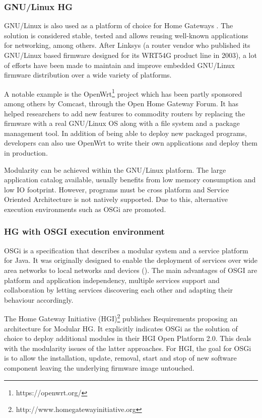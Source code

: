 \subsubsection{GNU/Linux HG}
   
GNU/Linux is also used as a platform of choice for Home Gateways \cite{royon_multiservice_2007}.
The solution is considered stable, tested and allows reusing well-known applications for networking, among others.
After Linksys (a router vendor who published its GNU/Linux based firmware designed for its WRT54G product line in 2003), a lot of efforts have been made to maintain and improve embedded GNU/Linux firmware distribution over a wide variety of platforms.

A notable example is the OpenWrt\footnote{https://openwrt.org/} project which has been partly sponsored among others by Comcast, through the Open Home Gateway Forum.
It has helped researchers to add new features to commodity routers by replacing the firmware with a real GNU/Linux OS along with a file system and a package management tool.
In addition of being able to deploy new packaged programs, developers can also use OpenWrt to write their own applications and deploy them in production.


Modularity can be achieved within the GNU/Linux platform.
The large application catalog available, usually benefits from low memory consumption and low IO footprint.
However, programs must be cross platform and Service Oriented Architecture is not natively supported.
Due to this, alternative execution environments such as OSGi are promoted.
   
\subsubsection{HG with OSGI execution environment}
   
OSGi is a specification that describes a modular system and a service platform for Java.
It was originally designed to enable the deployment of services over wide area networks to local networks and devices (\cite{marples_open_2001}).
The main advantages of OSGI are platform and application independency, multiple services support and collaboration by letting services discovering each other and adapting their behaviour accordingly.

The Home Gateway Initiative (HGI)\footnote{http://www.homegatewayinitiative.org} publishes Requirements \cite{_requirements_2011} \cite{_hg_2014} proposing an architecture for Modular HG.
It explicitly indicates OSGi as the solution of choice to deploy additional modules in their HGI Open Platform 2.0.
This deals with the modularity issues of the latter approaches.
For HGI, the goal for OSGi is to allow the installation, update, removal, start and stop of new software component leaving the underlying firmware image untouched.

